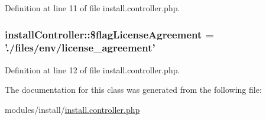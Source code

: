 Definition at line 11 of file install.\+controller.\+php.

\hypertarget{classinstallController_af1f7a5fe91be6a576cdffcc07cba5be8}{
\subsubsection[{\$flag\+License\+Agreement}]{\setlength{\rightskip}{0pt plus 5cm}install\+Controller\+::\$flag\+License\+Agreement = './files/env/license\+\_\+agreement'}}\label{classinstallController_af1f7a5fe91be6a576cdffcc07cba5be8}


Definition at line 12 of file install.\+controller.\+php.



The documentation for this class was generated from the following file\+:\begin{DoxyCompactItemize}
\item 
modules/install/\hyperlink{install_8controller_8php}{install.\+controller.\+php}\end{DoxyCompactItemize}
